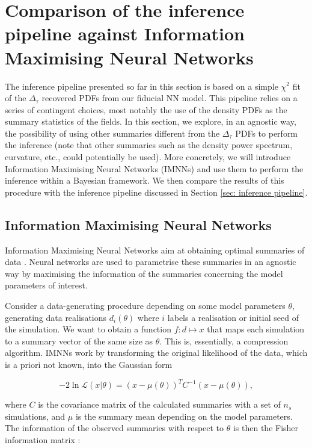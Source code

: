 \section{Comparison of the inference pipeline against Information Maximising Neural Networks}


The inference pipeline presented so far in this section is based on a simple $\chi^2$ fit of the $\Delta_\tau$ recovered PDFs from our fiducial NN model. This pipeline relies on a series of contingent choices, most notably the use of the density PDFs as the summary statistics of the fields. In this section, we explore, in an agnostic way, the possibility of using other summaries different from the $\Delta_\tau$ PDFs to perform the inference (note that other summaries such as the density power spectrum, curvature, etc., could potentially be used). More concretely, we will introduce Information Maximising Neural Networks (IMNNs) and use them to perform the inference within a Bayesian framework. We then compare the results of this procedure with the inference pipeline discussed in Section \ref{sec: inference pipeline}.

\subsection{Information Maximising Neural Networks}
Information Maximising Neural Networks aim at obtaining optimal summaries of data \cite{Charnock_2018}. Neural networks are used to parametrise these summaries in an agnostic way by maximising the information of the summaries concerning the model parameters of interest.

Consider a data-generating procedure depending on some model parameters $\theta$, generating data realisations $d_i(\theta)$ where $i$ labels a realisation or initial seed of the simulation. We want to obtain a function $f \colon d \mapsto x$ that maps each simulation to a summary vector of the same size as $\theta$. This is, essentially, a compression algorithm. IMNNs work by transforming the original likelihood of the data, which is a priori not known, into the Gaussian form

\begin{equation}
    -2\ln\mathcal{L}\left(x|\theta\right)=\left(x-\mu\left(\theta\right)\right)^TC^{-1}\left(x-\mu\left(\theta\right)\right),
\end{equation}

where $C$ is the covariance matrix of the calculated summaries with a set of $n_s$ simulations, and $\mu$ is the summary mean depending on the model parameters. The information of the observed summaries with respect to $\theta$ is then the Fisher information matrix \cite{ly2017tutorialfisherinformation}:

